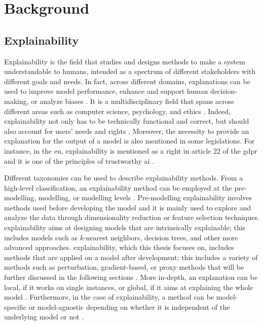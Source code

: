 \chapter{Background} \label{ch:background}



\section{Explainability} \label{sec:explainability}

Explainability is the field that studies and designs methods to make a system understandable to humans, intended as a spectrum of different stakeholders with different goals and needs. In fact, across different domains, explanations can be used to improve model performance, enhance and support human decision-making, or analyze biases \cite{2024_xai_manifesto}. It is a multidisciplinary field that spans across different areas such as computer science, psychology, and ethics \cite{2020_xai_survey}. Indeed, explainability not only has to be technically functional and correct, but should also account for users' needs and rights \cite{2021_xai_multidisciplinary}. Moreover, the necessity to provide an explanation for the output of a model is also mentioned in some legislations. For instance, in the \ac{eu}, explainability is mentioned as a right in article 22 of the \ac{gdpr} \cite{gdpr_22} and it is one of the principles of trustworthy \ac{ai} \cite{2019_eu_trustworthy_ai}.

Different taxonomies can be used to describe explainability methods. From a high-level classification, an explainability method can be employed at the pre-modelling, \antehoc modelling, or \posthoc modelling levels \cite{2021_mm_xai_survey, 2024_mm_xai_survey, 2024_xai_manifesto}. Pre-modelling explainability involves methods used before developing the model and it is mainly used to explore and analyze the data through dimensionality reduction or feature selection techniques. \Antehoc explainability aims at designing models that are intrinsically explainable; this includes models such as $k$-nearest neighbors, decision trees, and other more advanced approaches. \Posthoc explainability, which this thesis focuses on, includes methods that are applied on a model after development; this includes a variety of methods such as perturbation, gradient-based, or proxy methods that will be further discussed in the following sections \cite{2021_mm_xai_survey, 2024_mm_xai_survey}.
More in-depth, an explanation can be local, if it works on single instances, or global, if it aims at explaining the whole model \cite{2021_mm_xai_survey}.
Furthermore, in the case of \posthoc explainability, a method can be model-specific or model-agnostic depending on whether it is independent of the underlying model or not \cite{2021_mm_xai_survey, 2024_xai_manifesto}.

